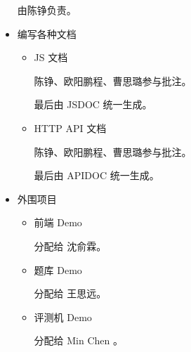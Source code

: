 \begin{itemize}
    由陈铮负责。
    
    \item 编写各种文档
    
    \begin{itemize}
        \item JS 文档
        
        陈铮、欧阳鹏程、曹思璐参与批注。
        
        最后由 JSDOC 统一生成。
        
        \item HTTP API 文档

        陈铮、欧阳鹏程、曹思璐参与批注。
        
        最后由 APIDOC 统一生成。
        
    \end{itemize}
        
    \item 外围项目
    
    \begin{itemize}
        \item 前端 Demo
        
        分配给 沈俞霖。
        
        \item 题库 Demo
        
        分配给 王思远。
        
        \item 评测机 Demo
        
        分配给 Min Chen 。
    \end{itemize}
\end{itemize}
